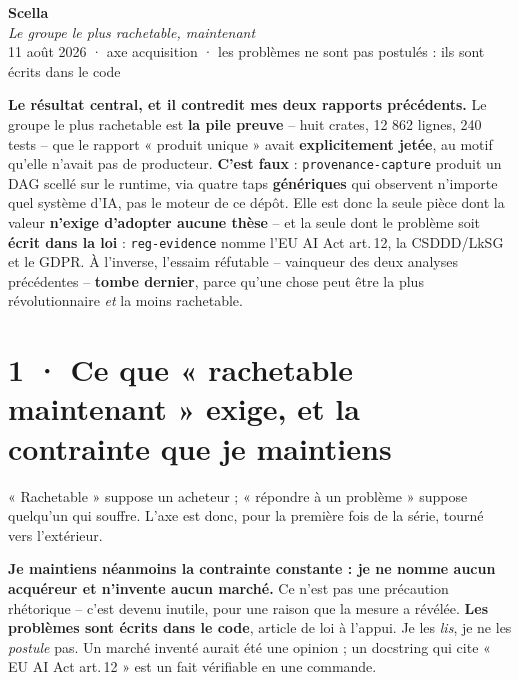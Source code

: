 \documentclass[10pt]{article}
\newcommand{\code}[1]{\texttt{\small #1}}
\begin{document}
\begin{center}
{\Huge\bfseries\color{navy} Scella}\\[4pt]
{\large\color{grey}\itshape Le groupe le plus rachetable, maintenant}\\[4pt]
{\small\color{grey} 11 août 2026 \; · \; axe acquisition \; · \; les problèmes ne sont pas postulés : ils sont écrits dans le code}
\end{center}
\vspace{2pt}

\begin{these}
\textbf{Le résultat central, et il contredit mes deux rapports précédents.} Le groupe le plus
rachetable est \textbf{la pile preuve} -- huit crates, 12 862 lignes, 240 tests -- que le rapport
« produit unique » avait \textbf{explicitement jetée}, au motif qu'elle n'avait pas de producteur.
\textbf{C'est faux} : \code{provenance-capture} produit un DAG scellé sur le runtime, via quatre taps
\textbf{génériques} qui observent n'importe quel système d'IA, pas le moteur de ce dépôt. Elle est donc
la seule pièce dont la valeur \textbf{n'exige d'adopter aucune thèse} -- et la seule dont le problème
soit \textbf{écrit dans la loi} : \code{reg-evidence} nomme l'EU AI Act art.\,12, la CSDDD/LkSG et le
GDPR. À l'inverse, l'essaim réfutable -- vainqueur des deux analyses précédentes -- \textbf{tombe
dernier}, parce qu'une chose peut être la plus révolutionnaire \emph{et} la moins rachetable.
\end{these}

\section{1 · Ce que « rachetable maintenant » exige, et la contrainte que je maintiens}

« Rachetable » suppose un acheteur ; « répondre à un problème » suppose quelqu'un qui souffre. L'axe
est donc, pour la première fois de la série, tourné vers l'extérieur.

\begin{alerte}
\textbf{Je maintiens néanmoins la contrainte constante : je ne nomme aucun acquéreur et n'invente aucun
marché.} Ce n'est pas une précaution rhétorique -- c'est devenu inutile, pour une raison que la mesure
a révélée. \textbf{Les problèmes sont écrits dans le code}, article de loi à l'appui. Je les
\emph{lis}, je ne les \emph{postule} pas. Un marché inventé aurait été une opinion ; un docstring qui
cite « EU AI Act art.\,12 » est un fait vérifiable en une commande.
\end{alerte}
\end{document}
